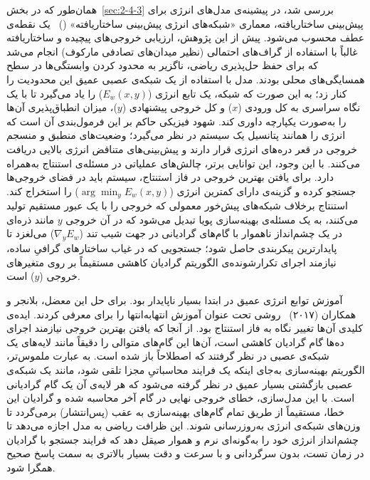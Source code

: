 همان‌طور که در بخش~\ref{sec:2-4-3} بررسی شد، در پیشینه‌ی مدل‌های انرژی برای پیش‌بینی ساختاریافته، معماری «شبکه‌های انرژی پیش‌بینی ساختاریافته» ()~\cite{belanger2016spen} یک نقطه‌ی عطف محسوب می‌شود. پیش از این پژوهش، ارزیابی خروجی‌های پیچیده و ساختاریافته غالباً با استفاده از گراف‌های احتمالی (نظیر میدان‌های تصادفی مارکوف) انجام می‌شد که برای حفظ حل‌پذیری ریاضی، ناگزیر به محدود کردن وابستگی‌ها در سطح همسایگی‌های محلی بودند. مدل  با استفاده از یک شبکه‌ی عصبی عمیق این محدودیت را کنار زد؛ به این صورت که شبکه، یک تابع انرژی ($E_w(x, y)$) را یاد می‌گیرد تا با یک نگاه سراسری به کل ورودی ($x$) و کل خروجی پیشنهادی ($y$)، میزان انطباق‌پذیری آن‌ها را به‌صورت یکپارچه داوری کند. شهود فیزیکی حاکم بر این فرمول‌بندی آن است که انرژی را همانند پتانسیل یک سیستم در نظر می‌گیرد؛ وضعیت‌های منطبق و منسجم خروجی در قعر دره‌های انرژی قرار دارند و پیش‌بینی‌های متناقض انرژی بالایی دریافت می‌کنند. با این وجود، این توانایی برتر، چالش‌های عملیاتی در مسئله‌ی استنتاج به‌همراه دارد. برای یافتن بهترین خروجی در فاز استنتاج، سیستم باید در فضای خروجی‌ها جستجو کرده و گزینه‌ی دارای کمترین انرژی ($\arg\min_y E_w(x, y)$) را استخراج کند. استنتاج برخلاف شبکه‌های پیش‌خور معمولی که خروجی را با یک عبور مستقیم تولید می‌کنند، به یک مسئله‌ی بهینه‌سازی پویا تبدیل می‌شود که در آن خروجی $y$ مانند ذره‌ای در یک چشم‌انداز ناهموار با گام‌های گرادیانی در جهت شیب تند ($\nabla_y E_w$) می‌لغزد تا پایدارترین پیکربندی حاصل شود؛ جستجویی که در غیاب ساختارهای گرافیِ ساده، نیازمند اجرای تکرارشونده‌ی الگوریتم گرادیان کاهشی مستقیماً بر روی متغیرهای خروجی ($y$) است.

آموزش توابع انرژی عمیق در ابتدا بسیار ناپایدار بود. برای حل این معضل، بلانجر و همکاران (۲۰۱۷)~\cite{belanger2017endtoend} روشی تحت عنوان آموزش انتها‌به‌انتها را برای  معرفی کردند. ایده‌ی کلیدی آن‌ها تغییر نگاه به فاز استنتاج بود. از آنجا که یافتن بهترین خروجی نیازمند اجرای ده‌ها گام گرادیان کاهشی است، آن‌ها این گام‌های متوالی را دقیقاً مانند لایه‌های یک شبکه‌ی عصبی در نظر گرفتند که اصطلاحاً باز شده است. به عبارت ملموس‌تر، الگوریتم بهینه‌سازی به‌جای اینکه یک فرایند محاسباتیِ مجزا تلقی شود، مانند یک شبکه‌ی عصبی بازگشتی بسیار عمیق در نظر گرفته می‌شود که هر لایه‌ی آن یک گام گرادیانی است. با این مدل‌سازی، خطای خروجی نهایی در گام آخر محاسبه شده و گرادیان این خطا، مستقیماً از طریق تمام گام‌های بهینه‌سازی به عقب (پس‌انتشار) برمی‌گردد تا وزن‌های شبکه‌ی انرژی به‌روزرسانی شوند. این ظرافت ریاضی به مدل اجازه می‌دهد تا چشم‌انداز انرژی خود را به‌گونه‌ای نرم و هموار صیقل دهد که فرایند جستجو با گرادیان در زمان تست، بدون سرگردانی و با سرعت و دقت بسیار بالاتری به سمت پاسخ صحیح همگرا شود.

